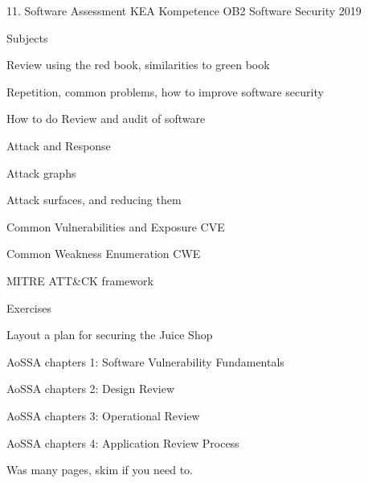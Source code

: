 \documentclass[Screen16to9,17pt]{foils}
\begin{document}
\mytitlepage
{11. Software Assessment}
{KEA Kompetence OB2 Software Security 2019}


\begin{list1}
\item Subjects
\begin{list2}
\item Review using the red book, similarities to green book
\item Repetition, common problems, how to improve software security
\item How to do Review and audit of software
\item Attack and Response
\item Attack graphs
\item Attack surfaces, and reducing them
\item Common Vulnerabilities and Exposure CVE
\item Common Weakness Enumeration CWE
\item MITRE ATT\&CK framework
\end{list2}
\item Exercises
\begin{list2}
\item Layout a plan for securing the Juice Shop
\end{list2}
\end{list1}


\begin{list1}
\item AoSSA chapters 1: Software Vulnerability Fundamentals
\item AoSSA chapters 2: Design Review
\item AoSSA chapters 3: Operational Review
\item AoSSA chapters 4: Application Review Process
\end{list1}

Was many pages, skim if you need to.



\begin{list1}
\item
\end{list1}




\end{document}

